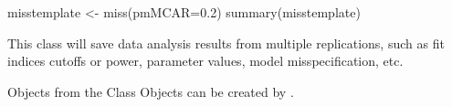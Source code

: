 \documentclass[a4paper]{book}
\begin{document}
%
\begin{Examples}
\begin{ExampleCode}
misstemplate <- miss(pmMCAR=0.2)
summary(misstemplate)
\end{ExampleCode}
\end{Examples}
%
\begin{Description}\relax
This class will save data analysis results from multiple replications, such as fit indices cutoffs or power, parameter values, model misspecification, etc.
\end{Description}
%
\begin{Section}{Objects from the Class}
Objects can be created by . 
\end{Section}
%
\end{document}

